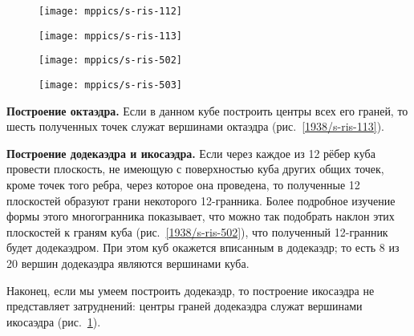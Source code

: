 {\begin{figure}[h]
\begin{minipage}{.24\textwidth}
\centering
\texttt{[image: mppics/s-ris-112]}
\end{minipage}\hfill
\begin{minipage}{.24\textwidth}
\centering
\texttt{[image: mppics/s-ris-113]}
\end{minipage}\hfill
\begin{minipage}{.24\textwidth}
\centering
\texttt{[image: mppics/s-ris-502]}
\end{minipage}
\hfill
\begin{minipage}{.24\textwidth}
\centering
\texttt{[image: mppics/s-ris-503]}
\end{minipage}

\medskip

\begin{minipage}{.24\textwidth}
\centering
\caption{}\label{1938/s-ris-112}
\end{minipage}\hfill
\begin{minipage}{.24\textwidth}
\centering
\caption{}\label{1938/s-ris-113}
\end{minipage}\hfill
\begin{minipage}{.24\textwidth}
\centering
\caption{}\label{1938/s-ris-502}
\end{minipage}
\hfill
\begin{minipage}{.24\textwidth}
\centering
\caption{}\label{1938/s-ris-503}
\end{minipage}
\vskip-4mm
\end{figure}


\textbf{Построение октаэдра.}
Если в данном кубе построить центры всех его граней, то шесть полученных точек служат вершинами октаэдра (рис.~\ref{1938/s-ris-113}).

\textbf{Построение додекаэдра и икосаэдра.}
Если через каждое из 12 рёбер куба провести плоскость, не имеющую с поверхностью куба других общих точек, кроме точек того ребра, через которое она проведена, то полученные 12 плоскостей образуют грани некоторого 12-гранника.
Более подробное изучение формы этого многогранника показывает, что можно так подобрать наклон этих плоскостей к граням куба (рис.~\ref{1938/s-ris-502}), что полученный 12-гранник будет додекаэдром.
При этом куб окажется вписанным в додекаэдр; то есть 8 из 20 вершин додекаэдра являются вершинами куба.

Наконец, если мы умеем построить додекаэдр, то построение икосаэдра не представляет затруднений: центры граней додекаэдра служат вершинами икосаэдра (рис.~\ref{1938/s-ris-503}).

}

